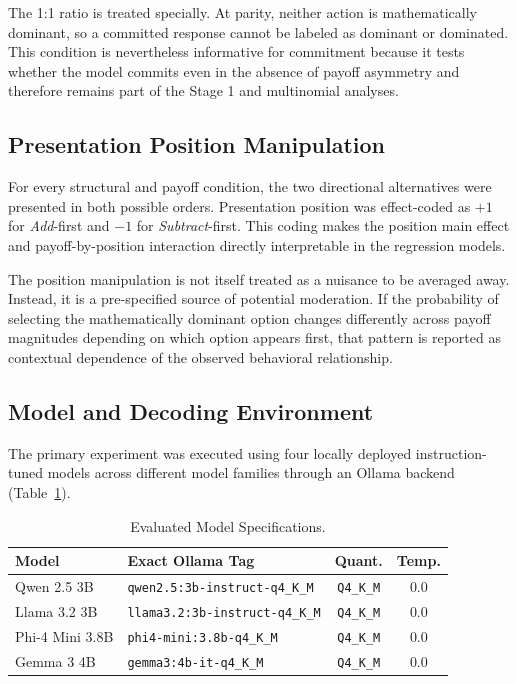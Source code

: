 \documentclass[10pt,journal,compsoc]{IEEEtran}
\begin{document}
The 1:1 ratio is treated specially. At parity, neither action is mathematically dominant, so a committed response cannot be labeled as dominant or dominated. This condition is nevertheless informative for commitment because it tests whether the model commits even in the absence of payoff asymmetry and therefore remains part of the Stage 1 and multinomial analyses.

\subsection{Presentation Position Manipulation}
For every structural and payoff condition, the two directional alternatives were presented in both possible orders. Presentation position was effect-coded as $+1$ for \textit{Add}-first and $-1$ for \textit{Subtract}-first. This coding makes the position main effect and payoff-by-position interaction directly interpretable in the regression models.

The position manipulation is not itself treated as a nuisance to be averaged away. Instead, it is a pre-specified source of potential moderation. If the probability of selecting the mathematically dominant option changes differently across payoff magnitudes depending on which option appears first, that pattern is reported as contextual dependence of the observed behavioral relationship.

\subsection{Model and Decoding Environment}
The primary experiment was executed using four locally
deployed instruction-tuned models across different model
families through an Ollama backend (Table~\ref{tab:models}).

\begin{table}[!t]
\centering
\caption{Evaluated Model Specifications.}
\label{tab:models}
\scriptsize
\setlength{\tabcolsep}{2.5pt}
\begin{tabular}{@{}lp{3.0cm}cc@{}}
\toprule
\textbf{Model} & \textbf{Exact Ollama Tag} & \textbf{Quant.} & \textbf{Temp.} \\
\midrule
Qwen 2.5 3B \cite{qwen25_2024} &
\texttt{qwen2.5:3b-instruct-}\newline\texttt{q4\_K\_M} &
\texttt{Q4\_K\_M} & 0.0 \\

Llama 3.2 3B \cite{llama32_2024} &
\texttt{llama3.2:3b-instruct-}\newline\texttt{q4\_K\_M} &
\texttt{Q4\_K\_M} & 0.0 \\

Phi-4 Mini 3.8B \cite{phi4mini_2025} &
\texttt{phi4-mini:3.8b-}\newline\texttt{q4\_K\_M} &
\texttt{Q4\_K\_M} & 0.0 \\

Gemma 3 4B \cite{gemma3_2025} &
\texttt{gemma3:4b-it-}\newline\texttt{q4\_K\_M} &
\texttt{Q4\_K\_M} & 0.0 \\

\bottomrule
\end{tabular}
\end{table}
\end{document}

